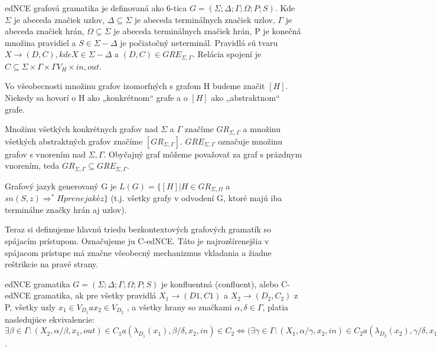 \begin{defin}
edNCE grafová gramatika je definovaná ako 6-tica 
$G =(\Sigma ;\Delta ;\Gamma ;\Omega ; P; S)$. 
Kde $\Sigma $  je abeceda značiek uzlov, 
$\Delta  \subseteq  \Sigma $ je abeceda terminálnych značiek uzlov, 
$\Gamma $ je abeceda značiek hrán, 
$\Omega \subseteq  \Sigma $  je abeceda terminálnych
značiek hrán, P je konečná množina pravidiel a $S \in  \Sigma - \Delta $ je
počiatočný neterminál. Pravidlá sú tvaru $X \to (D,C), kde X \in  \Sigma - \Delta $ a
$(D,C) \in  GRE_{\Sigma ,\Gamma }$. Relácia spojení je 
$C \subseteq  \Sigma \times \Gamma \times \Gamma V_H \times {in,out}$.
\end{defin}

Vo všeobecnosti množinu grafov izomorfných s grafom H budeme značit
$[ H ] $. Niekedy sa hovorí o H ako „konkrétnom“ grafe a o $[ H ]$ ako „abstraktnom“
grafe.

\begin{defin}
Množinu všetkých konkrétnych grafov nad $\Sigma$ a $\Gamma $ značíme
$GR_{\Sigma ,\Gamma }$ a množinu všetkých abstraktných grafov značíme 
$[GR_{\Sigma ,\Gamma }]$. $GRE_{\Sigma ,\Gamma }$ označuje množinu grafov 
s vnorením nad $\Sigma ,\Gamma $. Obyčajný graf môžeme považovať
za graf s prázdnym vnorením, teda $GR_{\Sigma ,\Gamma } 
\subseteq GRE_{\Sigma ,\Gamma }$.
\end{defin}

\begin{defin}
Grafový jazyk generovaný G je $L(G) = \{[H] | H \in GR_{\Sigma ,\Omega }$ 
a $sn(S,z) \Rightarrow ^* H pre nejaké z \} $
(t.j. všetky grafy v odvodení G, ktoré majú iba terminálne značky hrán aj uzlov).
\end{defin}

Teraz si definujeme hlavnú triedu bezkontextových grafových gramatík so
spájacím prístupom. Označujeme ju C-edNCE. Táto je najrozšírenejšia v
spájacom prístupe má značne všeobecný mechanizmus vkladania a žiadne
reštrikcie na pravé strany.

\begin{defin}
edNCE gramatika $G =(\Sigma ;\Delta ;\Gamma ;\Omega ; P; S)$ je konfluentná
(confluent), alebo C-edNCE gramatika, ak pre všetky pravidlá $X_1 \to (D1,C1)$
a $X_2 \to (D_2,C_2)$ z P, všetky uzly $x_1 \in V_{D_1} a x_2 \in V_{D_2}$ , a všetky hrany so
značkami $\alpha ,\delta \in \Gamma $, platia nasledujúce ekvivalencie:
$\exists \beta \in \Gamma  : (X_2, \alpha /\beta , x_1, out) \in C_1 a (\lambda _{D_1}(x_1), \beta /\delta , x_2, in) \in C_2
\Leftrightarrow 
( \exists \gamma \in \Gamma  : (X_1, \alpha /\gamma , x_2, in) \in C_2 a (\lambda _{D_2}(x_2),\gamma /\delta , x_1, out) \in C_1$.
\end{defin}

